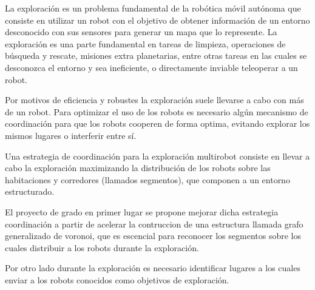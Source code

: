La exploración es un problema fundamental de la robótica móvil autónoma que
consiste en utilizar un robot con el objetivo de obtener información de un
entorno desconocido con sus sensores para generar un mapa que lo represente. La
exploración es una parte fundamental en tareas de limpieza, operaciones de
búsqueda y rescate, misiones extra planetarias, entre otras tareas en las
cuales se desconozca el entorno y sea ineficiente, o directamente inviable
teleoperar a un robot.

Por motivos de eficiencia y robustes la exploración suele llevarse a cabo con
más de un robot. Para optimizar el uso de los robots es necesario algún
mecanismo de coordinación para que los robots cooperen de forma optima,
evitando explorar los mismos lugares o interferir entre sí.

Una estrategia de coordinación para la exploración multirobot consiste en
llevar a cabo la exploración maximizando la distribución de los robots sobre
las habitaciones y corredores (llamados segmentos), que componen a un entorno
estructurado. 

El proyecto de grado en primer lugar se propone mejorar dicha estrategia
coordinación a partir de acelerar la contruccion de una estructura llamada
grafo generalizado de voronoi, que es escencial para reconocer los segmentos
sobre los cuales distribuir a los robots durante la exploración.

Por otro lado durante la exploración es necesario identificar lugares a los
cuales enviar a los robots conocidos como objetivos de exploración. 




